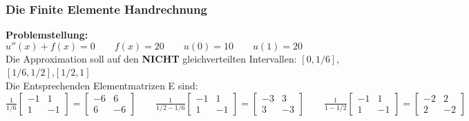 \subsubsection{Die Finite Elemente Handrechnung}
\textbf{Problemstellung:} $u''(x)+f(x)=0\qquad f(x)=20\qquad u(0)=10\qquad u(1)=20$\\

Die Approximation soll auf den \textbf{NICHT} gleichverteilten Intervallen: $[0,1/6]$,\quad $[1/6,1/2]$,\quad $[1/2,1]$\\

Die Entsprechenden Elementmatrizen E sind:\\

$
	\frac{1}{1/6}\begin{bmatrix}
		-1 & 1  \\
		1  & -1
	\end{bmatrix}=
	\begin{bmatrix}
		-6 & 6  \\
		6  & -6
	\end{bmatrix}\qquad
	\frac{1}{1/2-1/6}\begin{bmatrix}
		-1 & 1  \\
		1  & -1
	\end{bmatrix}=
	\begin{bmatrix}
		-3 & 3  \\
		3  & -3
	\end{bmatrix}\qquad
	\frac{1}{1-1/2}\begin{bmatrix}
		-1 & 1  \\
		1  & -1
	\end{bmatrix}=
	\begin{bmatrix}
		-2 & 2  \\
		2  & -2
	\end{bmatrix}
$\\
\\

